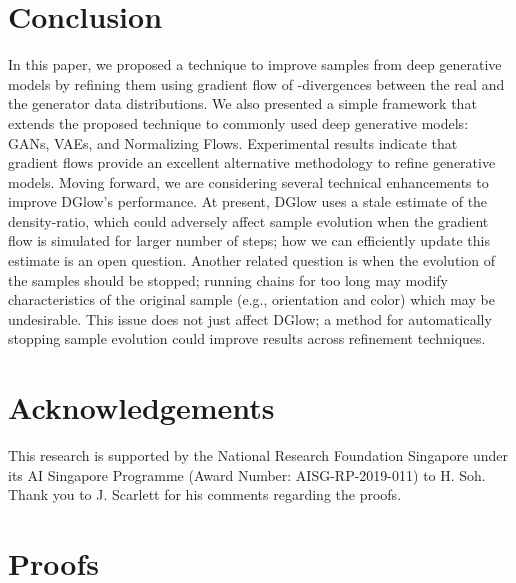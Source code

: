 \documentclass{article} \usepackage{iclr2021_conference,times}
\newcommand{\ourmethod}{\textsc{DG}low}
\begin{document}
 \vspace{-1em}
\section{Conclusion}
\vspace{-1em}
In this paper, we proposed a technique to improve samples from deep generative models by refining them using gradient flow of -divergences between the real and the generator data distributions. We also presented a simple framework that extends the proposed technique to  commonly used deep generative models: GANs, VAEs, and Normalizing Flows. Experimental results indicate that gradient flows provide an excellent alternative methodology to refine generative models. Moving forward, we are considering several technical enhancements to improve  \ourmethod{}'s performance. At present, \ourmethod{} uses a stale estimate of the density-ratio, which could adversely affect sample evolution when the gradient flow is simulated for larger number of steps; how we can efficiently update this estimate is an open question.  Another related question is when the evolution of the samples should be stopped; running chains for too long may modify characteristics of the original sample (e.g., orientation and color) which may be undesirable. This issue does not just affect \ourmethod{}; a method for automatically stopping sample evolution could improve results across  refinement techniques.

\section*{Acknowledgements}

This research is supported by the National Research Foundation Singapore under its AI Singapore Programme (Award Number: AISG-RP-2019-011) to H. Soh. Thank you to J. Scarlett for his comments regarding the proofs. 

\clearpage
\appendix
\section{Proofs}
\end{document}
